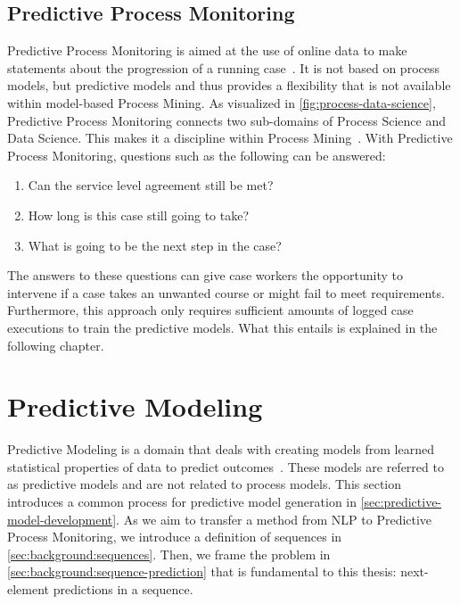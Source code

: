 \FloatBarrier
\subsection{Predictive Process Monitoring}\label{sec:predictive-process-monitoring}
Predictive Process Monitoring is aimed at the use of online data to make statements about the progression of a running case~\cite{francescomarino2015, schoenig2018}. It is not based on process models, but predictive models and thus provides a flexibility that is not available within model-based Process Mining.  As visualized in \autoref{fig:process-data-science}, Predictive Process Monitoring connects two sub-domains of Process Science and Data Science. This makes it a discipline within Process Mining~\cite{Aalst2016}. With Predictive Process Monitoring, questions such as the following can be answered:

\begin{enumerate}
    \item Can the service level agreement still be met?
    \item How long is this case still going to take?
    \item What is going to be the next step in the case?
\end{enumerate}

The answers to these questions can give case workers the opportunity to intervene if a case takes an unwanted course or might fail to meet requirements. Furthermore, this approach only requires sufficient amounts of logged case executions to train the predictive models. What this entails is explained in the following chapter.

\section{Predictive Modeling}\label{sec:predictive-modeling}
Predictive Modeling is a domain that deals with creating models from learned statistical properties of data to predict outcomes~\cite{sivaganesan1994predictive}. These models are referred to as predictive models and are not related to process models. This section introduces a common process for predictive model generation in \autoref{sec:predictive-model-development}.
As we aim to transfer a method from NLP to Predictive Process Monitoring, we introduce a definition of sequences in \autoref{sec:background:sequences}. Then, we frame the problem in \autoref{sec:background:sequence-prediction} that is fundamental to this thesis: next-element predictions in a sequence.


